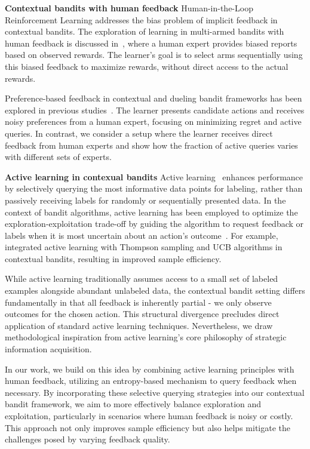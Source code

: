 \textbf{Contextual bandits with human feedback} Human-in-the-Loop Reinforcement Learning addresses the bias problem of implicit feedback in contextual bandits. The exploration of learning in multi-armed bandits with human feedback is discussed in~\citep{tang2019bandit}, where a human expert provides biased reports based on observed rewards. The learner's goal is to select arms sequentially using this biased feedback to maximize rewards, without direct access to the actual rewards.

Preference-based feedback in contextual and dueling bandit frameworks has been explored in previous studies~\citep{sekhari2023contextual,dudik2015contextual,saha2021optimal,wu2023borda}. The learner presents candidate actions and receives noisy preferences from a human expert, focusing on minimizing regret and active queries. In contrast, we consider a setup where the learner receives direct feedback from human experts and show how the fraction of active queries varies with different sets of experts.

\textbf{Active learning in contexual bandits} Active learning~\citep{judah2014active} enhances performance by selectively querying the most informative data points for labeling, rather than passively receiving labels for randomly or sequentially presented data. In the context of bandit algorithms, active learning has been employed to optimize the exploration-exploitation trade-off by guiding the algorithm to request feedback or labels when it is most uncertain about an action’s outcome~\citep{taylor2009transfer}. For example, \cite{bouneffouf2014contextual} integrated active learning with Thompson sampling and UCB algorithms in contextual bandits, resulting in improved sample efficiency.

While active learning traditionally assumes access to a small set of labeled examples alongside abundant unlabeled data, the contextual bandit setting differs fundamentally in that all feedback is inherently partial - we only observe outcomes for the chosen action. This structural divergence precludes direct application of standard active learning techniques. Nevertheless, we draw methodological inspiration from active learning's core philosophy of strategic information acquisition.

In our work, we build on this idea by combining active learning principles with human feedback, utilizing an entropy-based mechanism to query feedback when necessary. By incorporating these selective querying strategies into our contextual bandit framework, we aim to more effectively balance exploration and exploitation, particularly in scenarios where human feedback is noisy or costly. This approach not only improves sample efficiency but also helps mitigate the challenges posed by varying feedback quality.


